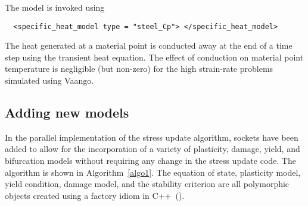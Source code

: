   The model is invoked using
  \lstset{language=XML}
  \begin{lstlisting}
  <specific_heat_model type = "steel_Cp"> </specific_heat_model>
  \end{lstlisting}

  The heat generated at a material point is conducted away at the end of a 
  time step using the transient heat equation.  The effect of conduction on
  material point temperature is negligible (but non-zero) for the high 
  strain-rate problems simulated using Vaango.

\subsection{Adding new models}
  In the parallel implementation of the stress update algorithm, sockets have 
  been added to allow for the incorporation of a variety of plasticity, damage, 
  yield, and bifurcation models without requiring any change in the stress 
  update code.  The algorithm is shown in Algorithm~\ref{algo1}.  The
  equation of state, plasticity model, yield condition, damage model, and
  the stability criterion are all polymorphic objects created using a 
  factory idiom in C++~(\cite{Coplien1992}).
